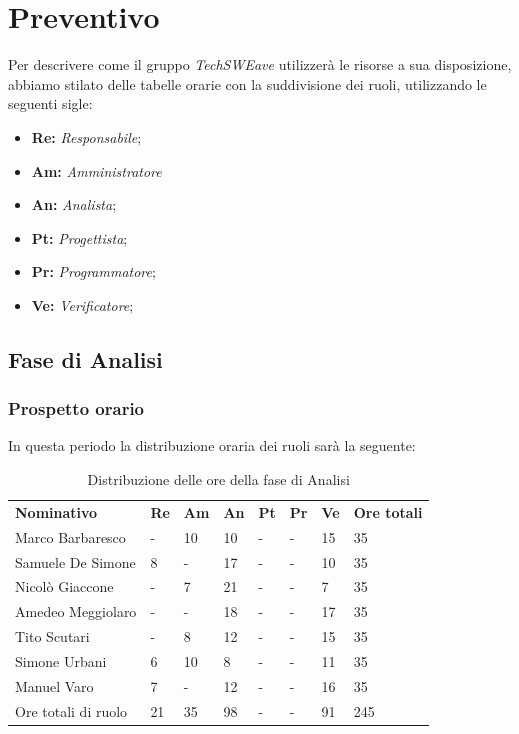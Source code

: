 \section{Preventivo}
Per descrivere come il gruppo \emph{TechSWEave} utilizzerà le risorse a sua disposizione, abbiamo stilato delle tabelle orarie con la suddivisione dei ruoli, utilizzando le seguenti sigle:
\begin{itemize}
    \item \textbf{Re: }\emph{Responsabile};
    \item \textbf{Am: }\emph{Amministratore}
    \item \textbf{An: }\emph{Analista};
    \item \textbf{Pt: }\emph{Progettista};
    \item \textbf{Pr: }\emph{Programmatore};
    \item \textbf{Ve: }\emph{Verificatore};
\end{itemize}

\subsection{Fase di Analisi}
    \subsubsection{Prospetto orario}
    In questa periodo la distribuzione oraria dei ruoli sarà la seguente:
        \begin{center}
            \begin{table}[ht!]
                \centering
                \caption{Distribuzione delle ore della fase di Analisi}
                \vspace{5px}
                \renewcommand{\arraystretch}{1.8}
                \begin{tabular}{p{100px} p{20px} p{20px} p{20px} p{20px} p{20px} p{20px} p{50px} }
                    \rowcolor{logo!70} \textbf{Nominativo} & \textbf{Re} & \textbf{Am} & \textbf{An} & \textbf{Pt} & \textbf{Pr} & \textbf{Ve} & \textbf{Ore totali}\\
                    Marco Barbaresco & - & 10 & 10 & - & - & 15 & 35\\
                    Samuele De Simone & 8 & - & 17 & - & - & 10 & 35\\
                    Nicolò Giaccone & - & 7 & 21 & - & - & 7 & 35\\
                    Amedeo Meggiolaro & - & - & 18 & - & - & 17 & 35\\
                    Tito Scutari & - & 8 & 12 & - & - & 15 & 35\\
                    Simone Urbani & 6 & 10 & 8 & - & - & 11 & 35\\
                    Manuel Varo & 7 & - & 12 & - & - & 16 & 35\\
                    Ore totali di ruolo & 21 & 35 & 98 & - & - & 91 & 245\\
                \end{tabular}
            \end{table}
        \end{center}

